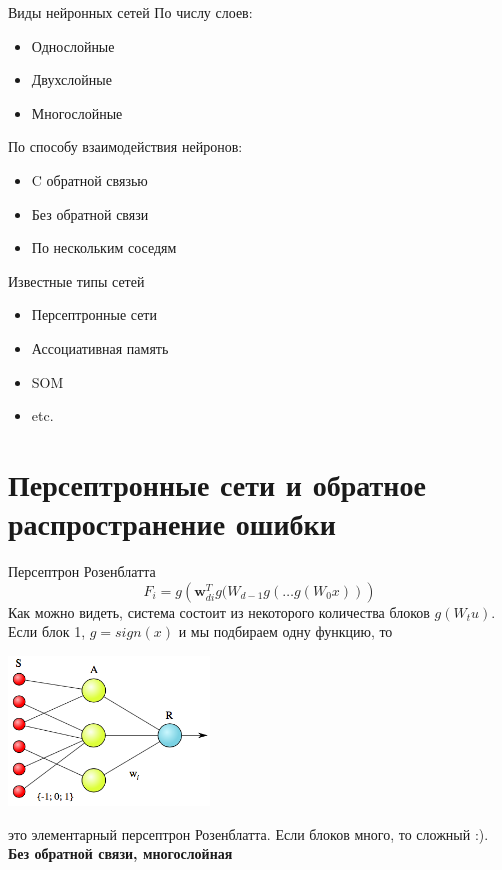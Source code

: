 \documentclass[14pt, fleqn, xcolor={dvipsnames, table}]{beamer}
\begin{document}
\begin{frame}{Виды нейронных сетей}
По числу слоев:
\begin{itemize}
  \item Однослойные 
  \item Двухслойные
  \item Многослойные
\end{itemize}

По способу взаимодействия нейронов:
\begin{itemize}
  \item C обратной связью
  \item Без обратной связи
  \item По нескольким соседям
\end{itemize}
\end{frame}

\begin{frame}{Известные типы сетей}
\begin{itemize}
  \item Персептронные сети
  \item Ассоциативная память
  \item SOM
  \item etc.
\end{itemize}
\end{frame}

\section{Персептронные сети и обратное распространение ошибки}

\begin{frame}{Персептрон Розенблатта}
\small
$$
F_i = g\left(\mathbf{w}_{di}^T g(W_{d-1}g(\ldots g(W_{0}x))\right)
$$
Как можно видеть, система состоит из некоторого количества блоков $g(W_tu)$. Если блок 1, $g = sign(x)$ и мы подбираем одну функцию, то
\begin{center}
\includegraphics[width=0.4\textwidth]{Simple_perceptron}
\end{center}
это элементарный персептрон Розенблатта. Если блоков много, то сложный :).\\
\textbf{Без обратной связи, многослойная}
\end{frame}
\end{document}
